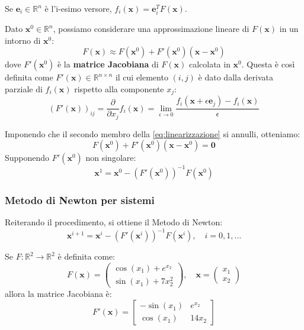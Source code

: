 \begin{osservazione}
    Se $\mathbf{e}_i \in \mathbb{R}^n$ è l'i-esimo versore, $f_i(\mathbf{x}) = \mathbf{e}_i^T F(\mathbf{x})$.
\end{osservazione}


Dato $\mathbf{x}^0 \in \mathbb{R}^n$, possiamo considerare una approssimazione lineare di $F(\mathbf{x})$ in un intorno di $\mathbf{x}^0$:
\begin{equation} \label{eq:linearizzazione}
    F(\mathbf{x}) \approx F(\mathbf{x}^0) + F'(\mathbf{x}^0)(\mathbf{x} - \mathbf{x}^0)
\end{equation}
dove $F'(\mathbf{x}^0)$ è la \textbf{matrice Jacobiana} di $F(\mathbf{x})$ calcolata in $\mathbf{x}^0$.
Questa è così definita come $F'(\mathbf{x}) \in \mathbb{R}^{n \times n}$ il cui elemento $(i,j)$ è dato dalla derivata parziale di $f_i(\mathbf{x})$ rispetto alla componente $x_j$:
$$ (F'(\mathbf{x}))_{ij} = \frac{\partial}{\partial x_j} f_i(\mathbf{x}) = \lim_{\epsilon \to 0} \frac{f_i(\mathbf{x} + \epsilon \mathbf{e}_j) - f_i(\mathbf{x})}{\epsilon} $$

Imponendo che il secondo membro della \eqref{eq:linearizzazione} si annulli, otteniamo:
$$ F(\mathbf{x}^0) + F'(\mathbf{x}^0)(\mathbf{x} - \mathbf{x}^0) = \mathbf{0} $$
Supponendo $F'(\mathbf{x}^0)$ non singolare:
$$ \mathbf{x}^1 = \mathbf{x}^0 - (F'(\mathbf{x}^0))^{-1} F(\mathbf{x}^0) $$

\subsubsection{Metodo di Newton per sistemi}
Reiterando il procedimento, si ottiene il Metodo di Newton:
\begin{equation} \label{eq:newton_sis}
    \mathbf{x}^{i+1} = \mathbf{x}^i - (F'(\mathbf{x}^i))^{-1} F(\mathbf{x}^i), \quad i=0,1,\dots
\end{equation}

\begin{esempio}
Se $F: \mathbb{R}^2 \to \mathbb{R}^2$ è definita come:
$$ F(\mathbf{x}) = \begin{pmatrix} \cos(x_1) + e^{x_2} \\ \sin(x_1) + 7x_2^2 \end{pmatrix}, \quad \mathbf{x} = \begin{pmatrix} x_1 \\ x_2 \end{pmatrix} $$
allora la matrice Jacobiana è:
$$ F'(\mathbf{x}) = \begin{bmatrix} -\sin(x_1) & e^{x_2} \\ \cos(x_1) & 14x_2 \end{bmatrix} $$
\end{esempio}


